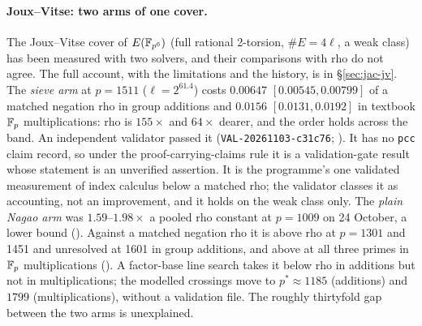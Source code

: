 \paragraph{Joux--Vitse: two arms of one cover.} The Joux--Vitse cover of
$E(\mathbb{F}_{p^6})$ (full rational 2-torsion, $\#E=4\ell$, a weak class) has been
measured with two solvers, and their comparisons with rho do not agree.
The full account, with the limitations and the history, is in
\S\ref{sec:jac-jv}. The \emph{sieve arm} at $p=1511$ ($\ell=2^{61.4}$)
costs $0.00647$ $[0.00545,0.00799]$ of a matched negation rho in group
additions and $0.0156$ $[0.0131,0.0192]$ in textbook $\mathbb{F}_p$ multiplications:
rho is $155\times$ and $64\times$ dearer, and the order holds across the
band. An independent validator passed it (\texttt{VAL-20261103-c31c76};
). It has no \texttt{pcc} claim
record, so under the proof-carrying-claims rule it is a validation-gate
result whose statement is an unverified assertion. It is the programme's
one validated measurement of index calculus below a matched rho; the
validator classes it as accounting, not an improvement, and it holds on the
weak class only. The \emph{plain Nagao arm} was $1.59$--$1.98\times$ a pooled
rho constant at $p=1009$ on 24 October, a lower bound
(). Against a matched negation rho
it is above rho at $p=1301$ and 1451 and unresolved at 1601 in group
additions, and above at all three primes in $\mathbb{F}_p$ multiplications
(). A factor-base line search
takes it below rho in additions but not in multiplications; the modelled
crossings move to $p^*\approx1185$ (additions) and $1799$ (multiplications),
without a validation file. The roughly thirtyfold gap between the two arms
is unexplained.

